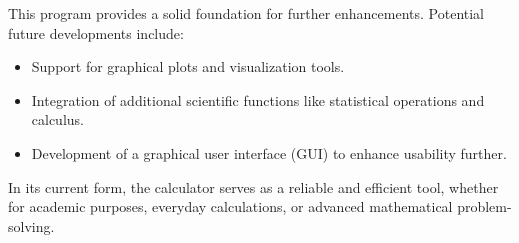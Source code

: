 \documentclass[a4paper,12pt]{article}
\begin{document}
This program provides a solid foundation for further enhancements. Potential future developments include:
\begin{itemize}
    \item Support for graphical plots and visualization tools.
    \item Integration of additional scientific functions like statistical operations and calculus.
    \item Development of a graphical user interface (GUI) to enhance usability further.
\end{itemize}

In its current form, the calculator serves as a reliable and efficient tool, whether for academic purposes, everyday calculations, or advanced mathematical problem-solving.
\end{document}
